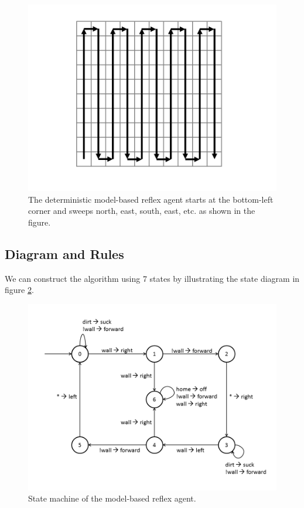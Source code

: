 \begin{figure}[!t]
	\centering
	\includegraphics[scale=.30]{img/3-motion.png}
	\caption{The deterministic model-based reflex agent starts at the bottom-left corner and sweeps north, east, south, east, etc. as shown in the figure.}
	\label{fig:motion}
\end{figure}

\subsection{Diagram and Rules}

We can construct the algorithm using 7 states by illustrating the state diagram in figure \ref{fig:states}.

\begin{figure}[!t]
	\centering
	\includegraphics[scale=.30]{img/3-statediag.png}
	\caption{State machine of the model-based reflex agent.}
	\label{fig:states}
\end{figure}

